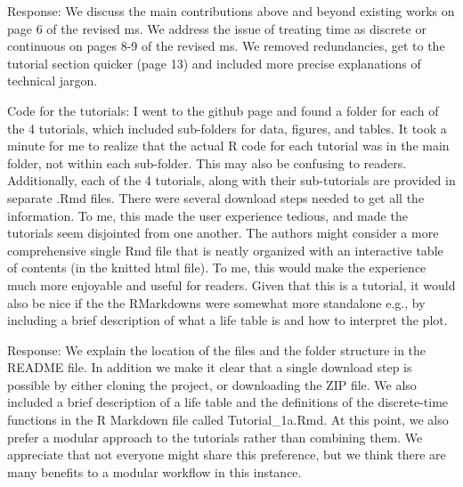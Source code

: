 \documentclass[
]{article}
\renewenvironment{quote}{\begin{leftbar}}{\end{leftbar}}
\begin{document}
Response: We discuss the main contributions above and beyond existing
works on page 6 of the revised ms. We address the issue of treating time
as discrete or continuous on pages 8-9 of the revised ms. We removed
redundancies, get to the tutorial section quicker (page 13) and included
more precise explanations of technical jargon.

\begin{quote}
Code for the tutorials: I went to the github page and found a folder for
each of the 4 tutorials, which included sub-folders for data, figures,
and tables. It took a minute for me to realize that the actual R code
for each tutorial was in the main folder, not within each sub-folder.
This may also be confusing to readers. Additionally, each of the 4
tutorials, along with their sub-tutorials are provided in separate .Rmd
files. There were several download steps needed to get all the
information. To me, this made the user experience tedious, and made the
tutorials seem disjointed from one another. The authors might consider a
more comprehensive single Rmd file that is neatly organized with an
interactive table of contents (in the knitted html file). To me, this
would make the experience much more enjoyable and useful for readers.
Given that this is a tutorial, it would also be nice if the the
RMarkdowns were somewhat more standalone e.g., by including a brief
description of what a life table is and how to interpret the plot.
\end{quote}

Response: We explain the location of the files and the folder structure
in the README file. In addition we make it clear that a single download
step is possible by either cloning the project, or downloading the ZIP
file. We also included a brief description of a life table and the
definitions of the discrete-time functions in the R Markdown file called
Tutorial\_1a.Rmd. At this point, we also prefer a modular approach to
the tutorials rather than combining them. We appreciate that not
everyone might share this preference, but we think there are many
benefits to a modular workflow in this instance.
\end{document}
